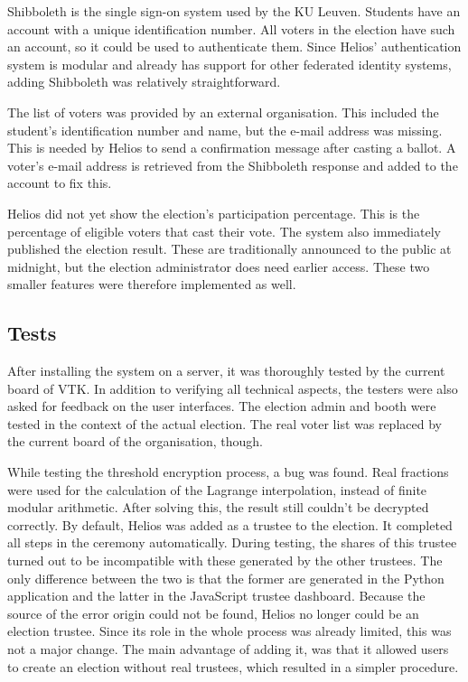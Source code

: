 Shibboleth is the single sign-on system used by the KU Leuven. Students have an account with a unique identification number. All voters in the election have such an account, so it could be used to authenticate them. Since Helios' authentication system is modular and already has support for other federated identity systems, adding Shibboleth was relatively straightforward.

\par The list of voters was provided by an external organisation. This included the student's identification number and name, but the e-mail address was missing. This is needed by Helios to send a confirmation message after casting a ballot. A voter's e-mail address is retrieved from the Shibboleth response and added to the account to fix this.

\par Helios did not yet show the election's participation percentage. This is the percentage of eligible voters that cast their vote. The system also immediately published the election result. These are traditionally announced to the public at midnight, but the election administrator does need earlier access. These two smaller features were therefore implemented as well.

\subsection{Tests}
\label{sec:be:tests}

After installing the system on a server, it was thoroughly tested by the current board of VTK. In addition to verifying all technical aspects, the testers were also asked for feedback on the user interfaces. The election admin and booth were tested in the context of the actual election. The real voter list was replaced by the current board of the organisation, though.

\par While testing the threshold encryption process, a bug was found. Real fractions were used for the calculation of the Lagrange interpolation, instead of finite modular arithmetic. After solving this, the result still couldn't be decrypted correctly. By default, Helios was added as a trustee to the election. It completed all steps in the ceremony automatically. During testing, the shares of this trustee turned out to be incompatible with these generated by the other trustees. The only difference between the two is that the former are generated in the Python application and the latter in the JavaScript trustee dashboard. Because the source of the error origin could not be found, Helios no longer could be an election trustee. Since its role in the whole process was already limited, this was not a major change. The main advantage of adding it, was that it allowed users to create an election without real trustees, which resulted in a simpler procedure.

